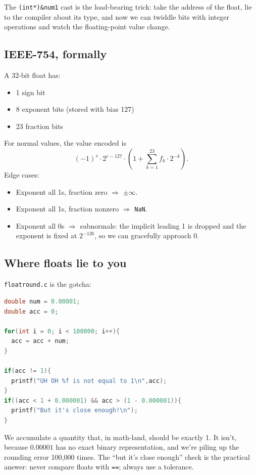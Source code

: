 \documentclass[11pt]{article}
\begin{document}
The \texttt{(int*)\&num1} cast is the load-bearing trick: take the
address of the float, lie to the compiler about its type, and now
we can twiddle bits with integer operations and watch the
floating-point value change.

\subsection*{IEEE-754, formally}

A 32-bit float has:
\begin{itemize}
  \item 1 sign bit
  \item 8 exponent bits (stored with bias 127)
  \item 23 fraction bits
\end{itemize}
For normal values, the value encoded is
\[
  (-1)^s \cdot 2^{e - 127} \cdot \left(1 + \sum_{k=1}^{23} f_k \cdot 2^{-k}\right).
\]
Edge cases:
\begin{itemize}
  \item Exponent all 1s, fraction zero $\Rightarrow$ $\pm\infty$.
  \item Exponent all 1s, fraction nonzero $\Rightarrow$ \texttt{NaN}.
  \item Exponent all 0s $\Rightarrow$ subnormals: the implicit
    leading 1 is dropped and the exponent is fixed at $2^{-126}$, so
    we can gracefully approach 0.
\end{itemize}

\subsection*{Where floats lie to you}

\texttt{floatround.c} is the gotcha:

\begin{lstlisting}[language=C]
double num = 0.00001;
double acc = 0;

for(int i = 0; i < 100000; i++){
  acc = acc + num;
}

if(acc != 1){
  printf("UH OH %f is not equal to 1\n",acc);
}
if((acc < 1 + 0.000001) && acc > (1 - 0.000001)){
  printf("But it's close enough!\n");
}
\end{lstlisting}

We accumulate a quantity that, in math-land, should be exactly 1.
It isn't, because $0.00001$ has no exact binary representation, and
we're piling up the rounding error 100{,}000 times. The
``but it's close enough'' check is the practical answer: never
compare floats with \texttt{==}; always use a tolerance.
\end{document}
